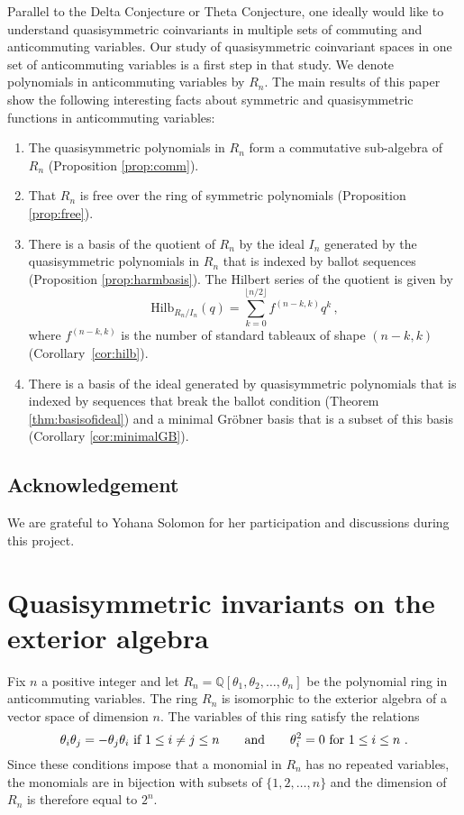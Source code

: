 \documentclass[submission]{FPSAC2023}
\theoremstyle{definition}
\numberwithin{equation}{section}
\begin{document}
Parallel to the Delta Conjecture or Theta Conjecture, one ideally would like to understand quasisymmetric coinvariants in multiple sets of commuting and anticommuting variables.  Our study of quasisymmetric coinvariant spaces in one set of anticommuting variables is a first step in that study.  We denote polynomials in anticommuting variables by $R_n$. The main results of this paper show the following interesting facts about symmetric and quasisymmetric functions in anticommuting variables:
\begin{enumerate}
\item The quasisymmetric polynomials in $R_n$ form a commutative sub-algebra of $R_n$
(Proposition \ref{prop:comm}).
\item That $R_n$ is free over the ring of symmetric polynomials (Proposition \ref{prop:free}).
\item There is a basis of the quotient of $R_n$ by the ideal $I_n$ generated by the
quasisymmetric polynomials in $R_n$ that is indexed by ballot sequences (Proposition \ref{prop:harmbasis}).
The Hilbert series of the quotient is given by
\begin{equation}
    \label{eq:hilb}
   \text{Hilb}_{R_n/I_n}(q) = \sum_{k=0}^{\lfloor{n/2}\rfloor} f^{(n-k,k)} q^k\,,
\end{equation}
 where $f^{(n-k,k)}$ is the  number  of standard tableaux of shape $(n-k,k)$ (Corollary~\ref{cor:hilb}).
\item There is a basis of the ideal generated by quasisymmetric polynomials
that is indexed by sequences that break the ballot condition
(Theorem \ref{thm:basisofideal}) and a minimal Gr\"obner basis
that is a subset of this basis (Corollary \ref{cor:minimalGB}).
\end{enumerate}

\subsection{Acknowledgement} We are grateful to Yohana Solomon for her participation and discussions during this project.



\section{Quasisymmetric invariants on the exterior algebra}

Fix $n$ a positive integer and
let $R_n = {\mathbb Q}[\theta_1, \theta_2, \ldots, \theta_n]$ be the
polynomial ring in anticommuting variables.
The ring $R_n$ is isomorphic to the exterior algebra of a vector
space of dimension $n$.  The variables of this ring satisfy the relations
\[
\theta_i \theta_j = - \theta_j \theta_i \hbox{ if } 1 \leq i \neq j \leq n
\qquad\hbox{and}\qquad \theta_i^2 = 0 \hbox{ for }1 \leq i \leq n~.
\]
Since these conditions impose that a monomial in $R_n$ has no repeated variables,
the monomials are in bijection with subsets of $\{1,2,\ldots, n\}$
and the dimension of $R_n$ is therefore equal to $2^n$.
\end{document}
